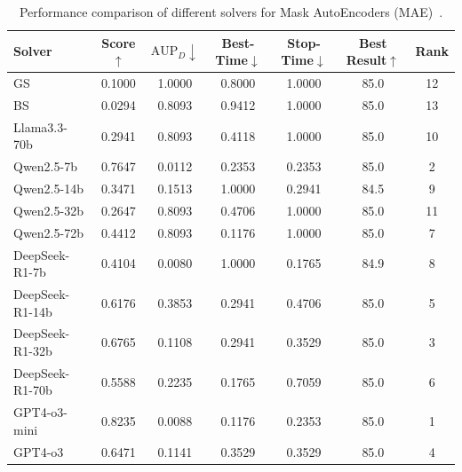 \begin{table}[h]
    \centering
    \setlength{\tabcolsep}{3pt}
    \renewcommand\arraystretch{1.5}
    \caption{Performance comparison of different solvers for Mask AutoEncoders (MAE)~\cite{mae}.}
    \begin{tabular}{l|cccccc}
    \toprule
    Solver           & Score$\uparrow$ & $\text{AUP}_D\downarrow$ & Best-Time$\downarrow$ & Stop-Time$\downarrow$ & Best Result$\uparrow$ & Rank \\
    \midrule
    GS & 0.1000 & 1.0000 & 0.8000 & 1.0000 & 85.0 & 12 \\
    BS & 0.0294 & 0.8093 & 0.9412 & 1.0000 & 85.0 & 13 \\
    Llama3.3-70b & 0.2941 & 0.8093 & 0.4118 & 1.0000 & 85.0 & 10 \\
    Qwen2.5-7b & 0.7647 & 0.0112 & 0.2353 & 0.2353 & 85.0 & 2 \\
    Qwen2.5-14b & 0.3471 & 0.1513 & 1.0000 & 0.2941 & 84.5 & 9 \\
    Qwen2.5-32b & 0.2647 & 0.8093 & 0.4706 & 1.0000 & 85.0 & 11 \\
    Qwen2.5-72b & 0.4412 & 0.8093 & 0.1176 & 1.0000 & 85.0 & 7 \\
    DeepSeek-R1-7b & 0.4104 & 0.0080 & 1.0000 & 0.1765 & 84.9 & 8 \\
    DeepSeek-R1-14b & 0.6176 & 0.3853 & 0.2941 & 0.4706 & 85.0 & 5 \\
    DeepSeek-R1-32b & 0.6765 & 0.1108 & 0.2941 & 0.3529 & 85.0 & 3 \\
    DeepSeek-R1-70b & 0.5588 & 0.2235 & 0.1765 & 0.7059 & 85.0 & 6 \\
    GPT4-o3-mini & 0.8235 & 0.0088 & 0.1176 & 0.2353 & 85.0 & 1 \\
    GPT4-o3 & 0.6471 & 0.1141 & 0.3529 & 0.3529 & 85.0 & 4 \\
    \bottomrule
    \end{tabular}
    \label{tab:MAE}
\end{table}


